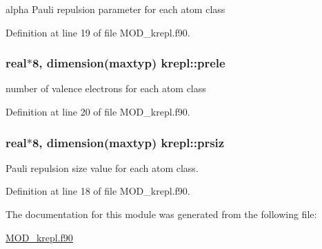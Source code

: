 alpha Pauli repulsion parameter for each atom class 



Definition at line 19 of file M\-O\-D\-\_\-krepl.\-f90.

\hypertarget{classkrepl_ae5b8779999bbef5ba6a79cd0269c1a43}{
\subsubsection[{prele}]{\setlength{\rightskip}{0pt plus 5cm}real$\ast$8, dimension(maxtyp) krepl\-::prele}}\label{classkrepl_ae5b8779999bbef5ba6a79cd0269c1a43}


number of valence electrons for each atom class 



Definition at line 20 of file M\-O\-D\-\_\-krepl.\-f90.

\hypertarget{classkrepl_a672084e82c0727951a550ebb84eb6b15}{
\subsubsection[{prsiz}]{\setlength{\rightskip}{0pt plus 5cm}real$\ast$8, dimension(maxtyp) krepl\-::prsiz}}\label{classkrepl_a672084e82c0727951a550ebb84eb6b15}


Pauli repulsion size value for each atom class. 



Definition at line 18 of file M\-O\-D\-\_\-krepl.\-f90.



The documentation for this module was generated from the following file\-:\begin{DoxyCompactItemize}
\item 
\hyperlink{MOD__krepl_8f90}{M\-O\-D\-\_\-krepl.\-f90}\end{DoxyCompactItemize}
